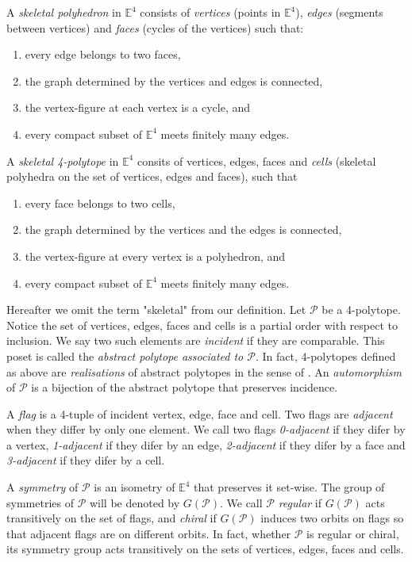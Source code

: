 \documentclass[spanish]{article}
\theoremstyle{definition}
\newcommand{\E}{\mathbb{E}}
\newcommand{\p}{\mathcal{P}}
\begin{document}
	A \textit{skeletal polyhedron} in $\E^4$ consists of \textit{vertices} (points in $\E^4$), \textit{edges} (segments between vertices) and \textit{faces} (cycles of the vertices) such that:
	\begin{enumerate}
		\item every edge belongs to two faces,
		\item the graph determined by the vertices and edges is connected,
		\item the vertex-figure at each vertex is a cycle, and
		\item every compact subset of $\E^4$ meets finitely many edges.
	\end{enumerate}
	A \textit{skeletal 4-polytope} in $\E^4$ consits of vertices, edges, faces and \textit{cells} (skeletal polyhedra on the set of vertices, edges and faces), such that
	\begin{enumerate}
		\item every face belongs to two cells,
		\item the graph determined by the vertices and the edges is connected,
		\item the vertex-figure at every vertex is a polyhedron, and
		\item every compact subset of $\E^4$ meets finitely many edges.
		\end{enumerate}
	
	Hereafter we omit the term "skeletal" from our definition. Let $\p$ be a 4-polytope. Notice the set of vertices, edges, faces and cells is a partial order with respect to inclusion. We say two such elements are \textit{incident} if they are comparable. This poset is called the \textit{abstract polytope associated to $\p$}. In fact, 4-polytopes defined as above are \textit{realisations} of abstract polytopes in the sense of \cite{abstract-polytopes}. An \textit{automorphism} of $\p$ is a bijection of the abstract polytope that preserves incidence.
	
	A \textit{flag} is a 4-tuple of incident vertex, edge, face and cell. Two flags are \textit{adjacent} when they differ by only one element. We call two flags \textit{0-adjacent} if they difer by a vertex, \textit{1-adjacent} if they difer by an edge, \textit{2-adjacent} if they difer by a face and \textit{3-adjacent} if they difer by a cell.
	
	A \textit{symmetry} of $\p$ is an isometry of $\E^4$ that preserves it set-wise. The group of symmetries of $\p$ will be denoted by $G(\p)$. We call $\p$ \textit{regular} if $G(\p)$ acts transitively on the set of flags, and \textit{chiral} if $G(\p)$ induces two orbits on flags so that adjacent flags are on different orbits. In fact, whether $\p$ is regular or chiral, its symmetry group acts transitively on the sets of vertices, edges, faces and cells.
	
\end{document}
